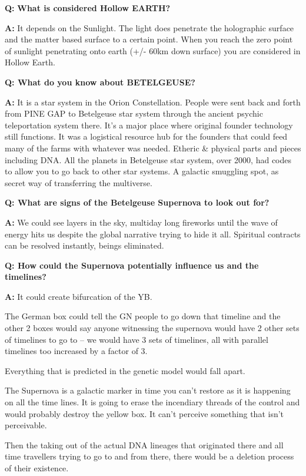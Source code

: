 \textbf{Q:} \textbf{What is considered Hollow EARTH?}

\textbf{A:} It depends on the Sunlight. The light does penetrate the
holographic surface and the matter based surface to a certain point.
When you reach the zero point of sunlight penetrating onto earth (+/-
60km down surface) you are considered in Hollow Earth.

\textbf{Q: What do you know about BETELGEUSE?}

\textbf{A:} It is a star system in the Orion Constellation. People were
sent back and forth from PINE GAP to Betelgeuse star system through the
ancient psychic teleportation system there. It's a major place where
original founder technology still functions. It was a logistical
resource hub for the founders that could feed many of the farms with
whatever was needed. Etheric \& physical parts and pieces including DNA.
All the planets in Betelgeuse star system, over 2000, had codes to allow
you to go back to other star systems. A galactic smuggling spot, as
secret way of transferring the multiverse.

\textbf{Q: What are signs of the Betelgeuse Supernova to look out for?}

\textbf{A:} We could see layers in the sky, multiday long fireworks
until the wave of energy hits us despite the global narrative trying to
hide it all. Spiritual contracts can be resolved instantly, beings
eliminated.

\textbf{Q: How could the Supernova potentially influence us and the
timelines?}

\textbf{A:} It could create bifurcation of the YB.

The German box could tell the GN people to go down that timeline and the
other 2 boxes would say anyone witnessing the supernova would have 2
other sets of timelines to go to -- we would have 3 sets of timelines,
all with parallel timelines too increased by a factor of 3.

Everything that is predicted in the genetic model would fall apart.

The Supernova is a galactic marker in time you can't restore as it is
happening on all the time lines. It is going to erase the incendiary
threads of the control and would probably destroy the yellow box. It
can't perceive something that isn't perceivable.

Then the taking out of the actual DNA lineages that originated there and
all time travellers trying to go to and from there, there would be a
deletion process of their existence.

